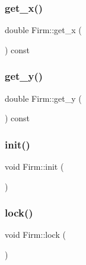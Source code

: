 \mbox{\label{class_firm_ab822c50adfd1d46136a100734348e4a5}} 
\subsubsection{\texorpdfstring{get\_x()}{get\_x()}}
{\footnotesize\ttfamily double Firm\+::get\+\_\+x (\begin{DoxyParamCaption}{ }\end{DoxyParamCaption}) const}

\mbox{\label{class_firm_a06194bc4ad64e00520e6ff0ee572d782}} 
\subsubsection{\texorpdfstring{get\_y()}{get\_y()}}
{\footnotesize\ttfamily double Firm\+::get\+\_\+y (\begin{DoxyParamCaption}{ }\end{DoxyParamCaption}) const}

\mbox{\label{class_firm_a4aaf2d43d344346ebc74f31f0f590f05}} 
\subsubsection{\texorpdfstring{init()}{init()}}
{\footnotesize\ttfamily void Firm\+::init (\begin{DoxyParamCaption}{ }\end{DoxyParamCaption})\hspace{0.3cm}{\ttfamily [protected]}}

\mbox{\label{class_firm_a269637146235f9026e0a73a16301824f}} 
\subsubsection{\texorpdfstring{lock()}{lock()}}
{\footnotesize\ttfamily void Firm\+::lock (\begin{DoxyParamCaption}{ }\end{DoxyParamCaption})\hspace{0.3cm}{\ttfamily [inline]}}

